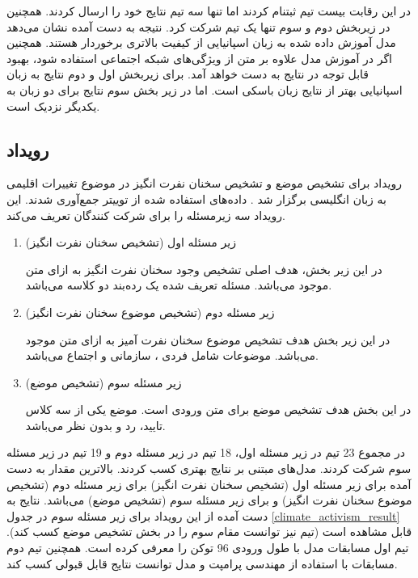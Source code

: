  در این رقابت بیست تیم ثبتنام کردند اما تنها سه تیم نتایج خود را ارسال کردند. همچنین در زیربخش  دوم و سوم تنها یک تیم شرکت کرد. نتیجه به دست آمده نشان می‌دهد مدل آموزش داده شده به زبان اسپانیایی از کیفیت بالاتری برخوردار هستند. همچنین اگر در آموزش مدل علاوه بر متن از ویژگی‌های شبکه اجتماعی استفاده شود، بهبود قابل توجه در نتایج به دست خواهد آمد. برای زیربخش اول و دوم نتایج به زبان اسپانیایی بهتر از نتایج زبان باسکی است. اما در
 زیر بخش سوم نتایج برای دو زبان به یکدیگر نزدیک است.
\subsection{رویداد
	}\label{sec:ClimateActivismStance}
رویداد 
برای تشخیص موضع و تشخیص سخنان نفرت انگیز
در موضوع تغییرات اقلیمی به زبان انگلیسی برگزار شد
\cite{thapa2024stance}.
داده‌های استفاده شده از توییتر جمع‌آوری شدند. این رویداد سه زیرمسئله را برای شرکت کنندگان تعریف می‌کند.
\begin{enumerate}
	\item زیر مسئله اول (تشخیص سخنان نفرت انگیز) 
	
در این زیر بخش، هدف  اصلی تشخیص وجود سخنان نفرت انگیز به ازای متن موجود می‌باشد. مسئله تعریف شده یک رده‌بند دو کلاسه می‌باشد.
	\item 
	زیر مسئله دوم (تشخیص موضوع سخنان نفرت انگیز)
	
	در این زیر بخش هدف تشخیص موضوع سخنان نفرت آمیز به ازای متن موجود می‌باشد. موضوعات شامل فردی
	،
	سازمانی
	و اجتماع
	می‌باشد.
	\item زیر مسئله سوم (تشخیص موضع)
	
	در این بخش هدف تشخیص موضع برای متن ورودی است. موضع یکی از سه کلاس تایید، رد و بدون نظر می‌باشد.
	
\end{enumerate}

در مجموع 23 تیم در زیر مسئله اول، 18 تیم در زیر مسئله دوم و 19 تیم در زیر مسئله سوم شرکت کردند.  مدل‌های مبتنی بر 
نتایج بهتری کسب کردند. 
بالاترین مقدار
به دست آمده برای زیر مسئله اول (تشخیص سخنان نفرت انگیز)
برای زیر مسئله دوم (تشخیص موضوع سخنان نفرت انگیز)
و برای زیر مسئله سوم (تشخیص موضع)
می‌باشد.
نتایج به دست آمده از این رویداد برای زیر مسئله سوم در جدول 
\ref{climate_activism_result}
قابل مشاهده است (تیم
نیز توانست مقام سوم را در بخش تشخیص موضع کسب کند). تیم اول مسابقات مدل
با طول ورودی 96 توکن را معرفی کرده است. همچنین تیم دوم مسابقات با استفاده از مهندسی پرامپت و مدل
توانست نتایج قابل قبولی کسب کند.

